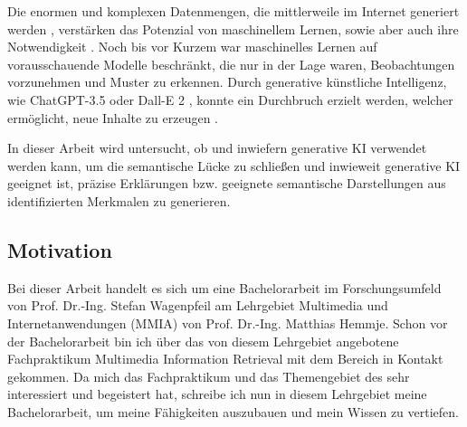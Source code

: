 Die enormen und komplexen Datenmengen, die mittlerweile im Internet generiert werden \cite{global-mobile-data-usage}, verstärken das Potenzial von maschinellem Lernen, sowie aber auch ihre Notwendigkeit \cite{mckinsey-generative-ai}.
Noch bis vor Kurzem war maschinelles Lernen auf vorausschauende Modelle beschränkt, die nur in der Lage waren, Beobachtungen vorzunehmen und Muster zu erkennen.
Durch generative künstliche Intelligenz, wie ChatGPT-3.5 \cite{chatgpt} oder Dall-E 2 \cite{dall-e-2}, konnte ein Durchbruch erzielt werden, welcher ermöglicht, neue Inhalte zu erzeugen \cite{mckinsey-generative-ai}.

In dieser Arbeit wird untersucht, ob und inwiefern generative KI verwendet werden kann, um die semantische Lücke zu schließen und inwieweit generative KI geeignet ist, präzise Erklärungen bzw. geeignete semantische Darstellungen aus identifizierten Merkmalen zu generieren.


\subsection{Motivation}
\label{sec1:intro:subsec:motivation}
Bei dieser Arbeit handelt es sich um eine Bachelorarbeit im Forschungsumfeld von Prof. Dr.-Ing. Stefan Wagenpfeil am Lehrgebiet Multimedia und Internetanwendungen (MMIA) von Prof. Dr.-Ing. Matthias Hemmje.
Schon vor der Bachelorarbeit bin ich über das von diesem Lehrgebiet angebotene Fachpraktikum Multimedia Information Retrieval mit dem Bereich \mmir{} in Kontakt gekommen.
Da mich das Fachpraktikum und das Themengebiet des \mmir{} sehr interessiert und begeistert hat, schreibe ich nun in diesem Lehrgebiet meine Bachelorarbeit, um meine Fähigkeiten auszubauen und mein Wissen zu vertiefen.


